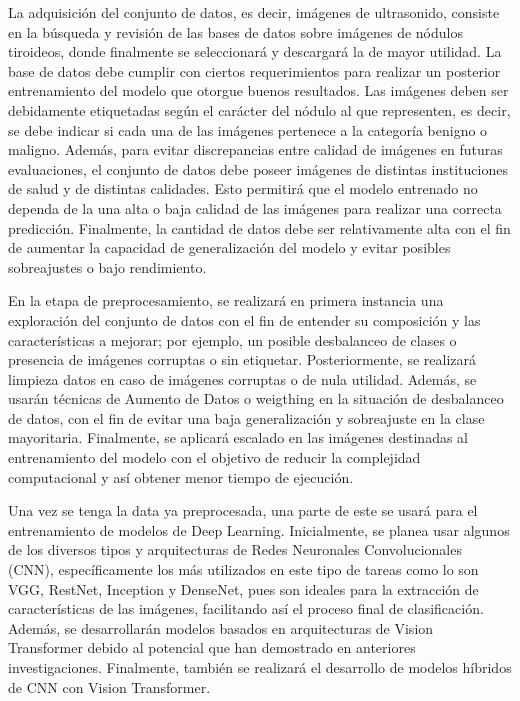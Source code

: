 La adquisición del conjunto de datos, es decir, imágenes de ultrasonido, consiste en la búsqueda y revisión de las bases de datos sobre imágenes de nódulos tiroideos, donde finalmente se seleccionará y descargará la de mayor utilidad. La base de datos debe cumplir con ciertos requerimientos para realizar un posterior entrenamiento del modelo que otorgue buenos resultados. Las imágenes deben ser debidamente etiquetadas según el carácter del nódulo al que representen, es decir, se debe indicar si cada una de las imágenes pertenece a la categoría benigno o maligno. Además, para evitar discrepancias entre calidad de imágenes en futuras evaluaciones, el conjunto de datos debe poseer imágenes de distintas instituciones de salud y de distintas calidades. Esto permitirá que el modelo entrenado no dependa de la una alta o baja calidad de las imágenes para realizar una correcta predicción. Finalmente, la cantidad de datos debe ser relativamente alta con el fin de aumentar la capacidad de generalización del modelo y evitar posibles sobreajustes o bajo rendimiento.  

En la etapa de preprocesamiento, se realizará en primera instancia una exploración del conjunto de datos con el fin de entender su composición y las características a mejorar; por ejemplo, un posible desbalanceo de clases o presencia de imágenes corruptas o sin etiquetar. Posteriormente, se realizará limpieza datos en caso de imágenes corruptas o de nula utilidad. Además, se usarán técnicas de Aumento de Datos o weigthing en la situación de desbalanceo de datos, con el fin de evitar una baja generalización y sobreajuste en la clase mayoritaria.  Finalmente, se aplicará escalado en las imágenes destinadas al entrenamiento del modelo con el objetivo de reducir la complejidad computacional y así obtener menor tiempo de ejecución.

Una vez se tenga la data ya preprocesada, una parte de este se usará para el entrenamiento de modelos de Deep Learning. Inicialmente, se planea usar algunos de los diversos tipos y arquitecturas de Redes Neuronales Convolucionales (CNN), específicamente los más utilizados en este tipo de tareas como lo son VGG, RestNet, Inception y DenseNet, pues son ideales para la extracción de características de las imágenes, facilitando así el proceso final de clasificación. Además, se desarrollarán modelos basados en arquitecturas de Vision Transformer debido al potencial que han demostrado en anteriores investigaciones. Finalmente, también se realizará el desarrollo de modelos híbridos de CNN con Vision Transformer. %

